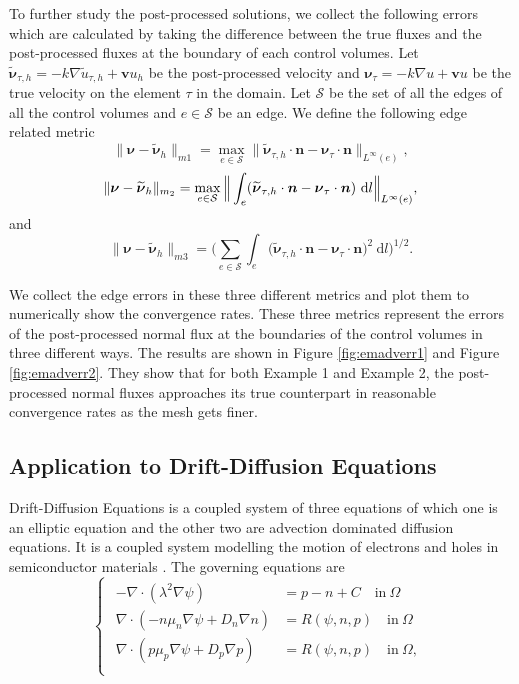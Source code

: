 \documentclass[times]{nlaauth}
\numberwithin{equation}{section}
\begin{document}
To further study the post-processed solutions, we collect the following errors which are calculated by taking the difference between the true fluxes and the post-processed fluxes at the boundary of each control volumes. Let $ \widetilde {\boldsymbol{\nu}}_{\tau, h} = -k \nabla \widetilde u_{\tau, h} + \boldsymbol{v} u_h $ be the post-processed velocity and $ \boldsymbol{\nu}_\tau = -k \nabla u + \boldsymbol{v} u $ be the true velocity on the element $\tau$ in the domain. Let $\mathcal{S}$ be the set of all the edges of all the control volumes and $e\in \mathcal{S}$ be an edge. We define the following edge related metric
$$
\| \boldsymbol{\nu} - \widetilde {\boldsymbol{\nu}}_h \|_{m1} = \max_{e\in \mathcal{S}} \| \widetilde {\boldsymbol{\nu}}_{\tau, h} \cdot \boldsymbol{n} - \boldsymbol{\nu}_\tau \cdot \boldsymbol{n}  \|_{L^\infty(e)}, 
$$
$$
\| \boldsymbol{\nu} - \widetilde {\boldsymbol{\nu}}_h \|_{m_2} = \max_{e\in \mathcal{S}} \Big{\|} \int_e ( \widetilde {\boldsymbol{\nu}}_{\tau, h} \cdot \boldsymbol{n} - \boldsymbol{\nu}_\tau \cdot \boldsymbol{n} ) \ \text{d} l \Big{\|}_{L^\infty(e)},
$$
and
$$
\| \boldsymbol{\nu} - \widetilde {\boldsymbol{\nu}}_h \|_{m3} = \Big( \displaystyle\sum_{e\in\mathcal{S}} \int_e \big( \widetilde {\boldsymbol{\nu}}_{\tau, h} \cdot \boldsymbol{n} - \boldsymbol{\nu}_\tau \cdot \boldsymbol{n}  \big)^2 \ \text{d} l \Big)^{1/2}.
$$

We collect the edge errors in these three different metrics and plot them to numerically show the convergence rates. These three metrics represent the errors of the post-processed normal flux at the boundaries of the control volumes in three different ways. The results are shown in Figure \ref{fig:emadverr1} and Figure \ref{fig:emadverr2}. They show that for both Example 1 and Example 2, the post-processed normal fluxes approaches its true counterpart in reasonable convergence rates as the mesh gets finer.

\subsection{Application to Drift-Diffusion Equations} \label{sec:drift}
Drift-Diffusion Equations is a coupled system of three equations of which one is an elliptic equation and the other two are advection dominated diffusion equations. It is a coupled system modelling the motion of electrons and holes in semiconductor materials \cite{mock1983analysis, markowich1986stationary}. The governing equations are
\begin{equation} \label{drift}
\begin{cases}
\begin{aligned}
- \nabla \cdot (\lambda^2 \nabla\psi) & = p - n + C \quad \text{in} \ \Omega \\
 \nabla \cdot ( - n \mu_n \nabla\psi + D_n \nabla n ) &= R(\psi, n, p)  \quad \text{in} \ \Omega \\
  \nabla \cdot ( p \mu_p \nabla\psi + D_p \nabla p ) & = R(\psi, n, p)   \quad \text{in} \ \Omega, \\
\end{aligned}
\end{cases}
\end{equation}
\end{document}
